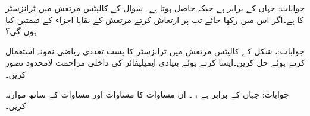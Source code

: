 جوابات: جہاں  کے برابر ہے جبکہ  حاصل ہوتا ہے۔
سوال  کے کالپٹس مرتعش میں ٹرانزسٹر کا  ہے۔اگر اس میں  رکھا جائے تب  پر ارتعاش کرتے مرتعش کے بقایا اجزاء کے قیمتیں کیا ہوں گی؟

جوابات:، 
شکل  کے کالپٹس مرتعش میں ٹرانزسٹر کا پست تعددی ریاضی نمونہ استعمال کرتے ہوئے حل کریں۔ایسا کرتے ہوئے بنیادی ایمپلیفائر کی داخلی مزاحمت  لامحدود تصور کریں۔

جوابات: جہاں  کے برابر ہے ، ۔ ان مساوات کا مساوات  اور مساوات  کے ساتھ موازنہ کریں۔
